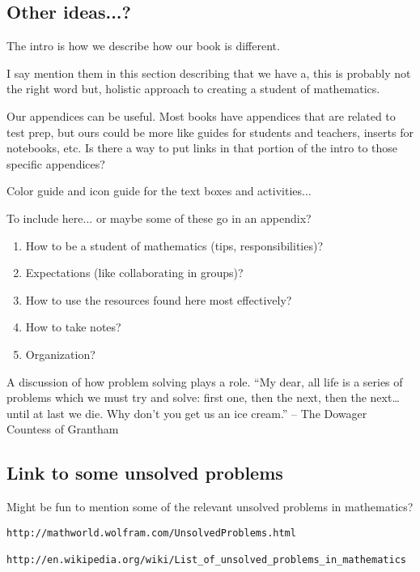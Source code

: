 \subsection{Other ideas...?}

The intro is how we describe how our book is different.  

I say mention them in this section describing that we have a, this is probably not the right word but, holistic approach to creating a student of mathematics.  

Our appendices can be useful.  Most books have appendices that are related to test prep, but ours could be more like guides for students and teachers, inserts for notebooks, etc.  Is there a way to put links in that portion of the intro to those specific appendices?

Color guide and icon guide for the text boxes and activities...

To include here... or maybe some of these go in an appendix?

\begin{enumerate}
\item How to be a student of mathematics (tips, responsibilities)?
\item Expectations (like collaborating in groups)?
\item How to use the resources found here most effectively?
\item How to take notes?
\item Organization?
\end{enumerate}

A discussion of how problem solving plays a role. ``My dear, all life is a series of problems which we must try and solve: first one, then the next, then the next\ldots{} until at last we die. Why don't you get us an ice cream.'' -- The Dowager Countess of Grantham

\subsection{Link to some unsolved problems}

Might be fun to mention some of the relevant unsolved problems in mathematics?

\begin{verbatim}
http://mathworld.wolfram.com/UnsolvedProblems.html

http://en.wikipedia.org/wiki/List_of_unsolved_problems_in_mathematics
\end{verbatim}

